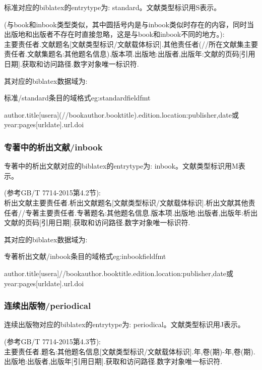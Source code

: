 \begin{refentry}{}{}
标准对应的biblatex的entrytype为: standard。文献类型标识用S表示。

(与book和inbook类型类似，其中圆括号内是与inbook类似时存在的内容，同时当出版地和出版者不存在时直接忽略，这是与book和inbook不同的地方。):\\
主要责任者.文献题名[文献类型标识/文献载体标识].其他责任者(//所在文献集主要责任者.文献集题名:其他题名信息).版本项.出版地:出版者,出版年:文献的页码[引用日期].获取和访问路径.数字对象唯一标识符.
\end{refentry}

其对应的biblatex数据域为:
\begin{example}{标准/standard条目的域格式}{eg:standardfieldfmt}
\begin{texlist}
author.title[usera](//bookauthor.booktitle).edition.location:publisher,date或year:pages[urldate].url.doi
\end{texlist}
\end{example}


\subsubsection{专著中的析出文献/inbook}
\begin{refentry}{}{}
专著中的析出文献对应的biblatex的entrytype为: inbook。文献类型标识用M表示。

(参考GB/T 7714-2015第4.2节):\\
析出文献主要责任者.析出文献题名[文献类型标识/文献载体标识].析出文献其他责任者//专著主要责任者.专著题名:其他题名信息.版本项.出版地:出版者,出版年:析出文献的页码[引用日期].获取和访问路径.数字对象唯一标识符.
\end{refentry}

其对应的biblatex数据域为:
\begin{example}{专著析出文献/inbook条目的域格式}{eg:inbookfieldfmt}
\begin{texlist}
author.title[usera]//bookauthor.booktitle.edition.location:publisher,date或year:pages[urldate].url.doi
\end{texlist}
\end{example}

\subsubsection{连续出版物/periodical}
\begin{refentry}{}{}
连续出版物对应的biblatex的entrytype为: periodical。文献类型标识用J表示。

(参考GB/T 7714-2015第4.3节):\\
主要责任者.题名:其他题名信息[文献类型标识/文献载体标识].年,卷(期)-年,卷(期).出版地:出版者,出版年[引用日期].获取和访问路径.数字对象唯一标识符.
\end{refentry}


